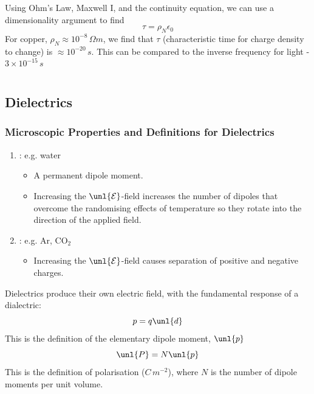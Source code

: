 \documentclass[a4paper, 11pt, normalem]{report}
\newcommand\E{\mathcal{E}}
\newcommand\uE{\unl{\E}}
\newcommand\eno{\epsilon_0}
\begin{document}
Using Ohm's Law, Maxwell \RN{1}, and the continuity equation, we can use a dimensionality argument to find
\begin{equation*}
    \tau = \rho_N\eno
\end{equation*}
For copper, $\rho_N \approx 10^{-8}\,\Omega m$, we find that $\tau$ (characteristic time for charge density to change) is $\approx 10^{-20}\,s$.
This can be compared to the inverse frequency for light - $3\times10^{-15}\,s$

\chapter{}
\section{Dielectrics}
\subsection{Microscopic Properties and Definitions for Dielectrics}
\begin{enumerate}
    \item {}: e.g. water
    \begin{itemize}
        \item A permanent dipole moment.
        \item Increasing the $\uE$-field increases the number of dipoles that overcome the randomising effects of temperature so they rotate into the direction of the applied field.
    \end{itemize}
    \item {}: e.g. Ar, CO$_2$
    \begin{itemize}
        \item Increasing the $\uE$-field causes separation of positive and negative charges.
    \end{itemize}
\end{enumerate}
Dielectrics produce their own electric field, with the fundamental response of a dialectric:
\begin{equation*}
    p = q\unl{d}
\end{equation*}
This is the definition of the elementary dipole moment, $\unl{p}$
\begin{equation*}
    \unl{P} = N\unl{p}
\end{equation*}
This is the definition of polarisation ($C\,m^{-2}$), where $N$ is the number of dipole moments per unit volume.
\end{document}
